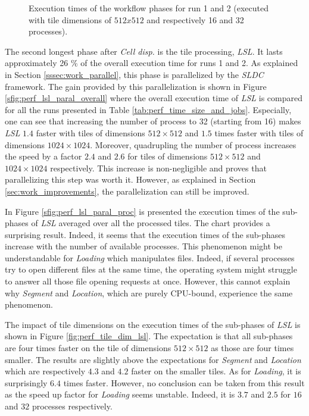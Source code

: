 \begin{figure}
	\caption{Execution times of the workflow phases for run 1 and 2 (executed with tile dimensions of $512x512$ and respectively 16 and 32 processes).}
	\label{fig:exec_time_work_phase_r1_2}
\end{figure}

The second longest phase after \textit{Cell disp.} is the tile processing, \textit{LSL}. It lasts approximately 26 \% of the overall execution time for runs 1 and 2. As explained in Section \ref{sssec:work_parallel}, this phase is parallelized by the \textit{SLDC} framework. The gain provided by this parallelization is shown in Figure \ref{sfig:perf_lsl_paral_overall} where the overall execution time of \textit{LSL} is compared for all the runs presented in Table \ref{tab:perf_time_size_and_jobs}. Especially, one can see that increasing the number of process to  32 (starting from 16) makes \textit{LSL} $1.4$ faster with tiles of dimensions $512\times 512$ and $1.5$ times faster with tiles of dimensions $1024\times 1024$. Moreover, quadrupling the number of process increases the speed by a factor $2.4$ and $2.6$ for tiles of dimensions $512 \times 512$ and $1024 \times 1024$ respectively. This increase is non-negligible and proves that parallelizing this step was worth it. However, as explained in Section \ref{sec:work_improvements}, the parallelization can still be improved. 

In Figure \ref{sfig:perf_lsl_paral_proc} is presented the execution times of the sub-phases of \textit{LSL} averaged over all the processed tiles. The chart provides a surprising result. Indeed, it seems that the execution times of the sub-phases increase with the number of available processes. This phenomenon might be understandable for \textit{Loading} which manipulates files. Indeed, if several processes try to open different files at the same time, the operating system might struggle to answer all those file opening requests at once. However, this cannot explain why \textit{Segment} and \textit{Location}, which are purely CPU-bound, experience the same phenomenon.

The impact of tile dimensions on the execution times of the sub-phases of \textit{LSL} is shown in Figure \ref{fig:perf_tile_dim_lsl}. The expectation is that all sub-phases are four times faster on the tile of dimensions $512\times 512$ as those are four times smaller. The results are slightly above the expectations for \textit{Segment} and \textit{Location} which are respectively $4.3$ and $4.2$ faster on the smaller tiles. As for \textit{Loading}, it is surprisingly $6.4$ times faster. However, no conclusion can be taken from this result as the speed up factor for \textit{Loading} seems unstable. Indeed, it is $3.7$ and $2.5$ for $16$ and $32$ processes respectively. 

